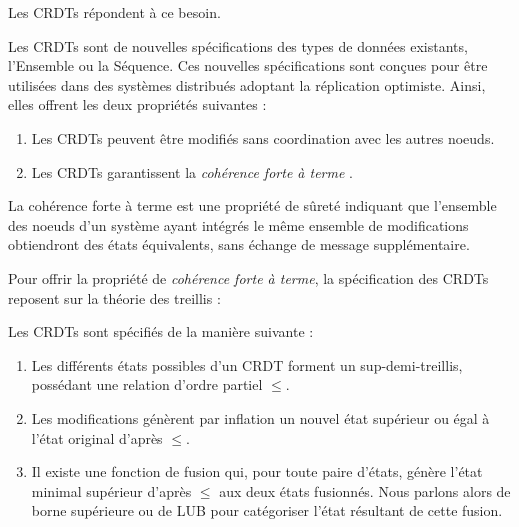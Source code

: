 Les \acfp{CRDT} \cite{shapiro_2011_crdt, 2018-crdts-perguica-baquero-shapiro, 2018-crdts-overview-preguica} répondent à ce besoin.

\begin{definition}
  Les \acp{CRDT} sont de nouvelles spécifications des types de données existants, \eg l'Ensemble ou la Séquence.
  Ces nouvelles spécifications sont conçues pour être utilisées dans des systèmes distribués adoptant la réplication optimiste.
  Ainsi, elles offrent les deux propriétés suivantes :

  \begin{enumerate}
    \item Les \acp{CRDT} peuvent être modifiés sans coordination avec les autres noeuds.
    \item Les \acp{CRDT} garantissent la \emph{cohérence forte à terme} \cite{shapiro_2011_crdt}.
  \end{enumerate}
\end{definition}

\begin{definition}
  \label{def:sec}
  La cohérence forte à terme est une propriété de sûreté indiquant que l'ensemble des noeuds d'un système ayant intégrés le même ensemble de modifications obtiendront des états équivalents, sans échange de message supplémentaire.
\end{definition}

Pour offrir la propriété de \emph{cohérence forte à terme}, la spécification des \acp{CRDT} reposent sur la théorie des treillis \cite{2002-intro-lattices-order-davey} :

\begin{definition}
  \label{def:spec-crdts}
  Les \acp{CRDT} sont spécifiés de la manière suivante :
  \begin{enumerate}
    \item Les différents états possibles d'un \ac{CRDT} forment un sup-demi-treillis, possédant une relation d'ordre partiel $\leq$.
    \item Les modifications génèrent par inflation un nouvel état supérieur ou égal à l'état original d'après $\leq$.
    \item \label{item:lub} Il existe une fonction de fusion qui, pour toute paire d'états, génère l'état minimal supérieur d'après $\leq$ aux deux états fusionnés.
    Nous parlons alors de borne supérieure ou de \ac{LUB} pour catégoriser l'état résultant de cette fusion.
  \end{enumerate}
\end{definition}


